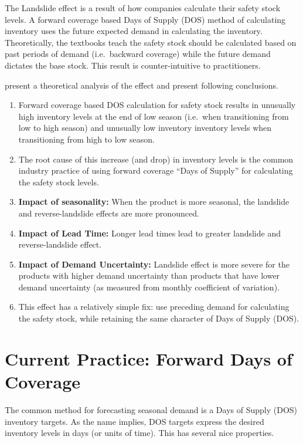 \documentclass[,msom,nonblindrev]{informs}
\providecommand{\tightlist}{%
  \setlength{\itemsep}{0pt}\setlength{\parskip}{0pt}}
\begin{document}
The Landslide effect is a result of how companies calculate their safety
stock levels. A forward coverage based Days of Supply (DOS) method of
calculating inventory uses the future expected demand in calculating the
inventory. Theoretically, the textbooks teach the safety stock should be
calculated based on past periods of demand (i.e.~backward coverage)
while the future demand dictates the base stock. This result is
counter-intuitive to practitioners.

\citet{neale2014} present a theoretical analysis of the effect and
present following conclusions.

\begin{enumerate}
\def\labelenumi{\arabic{enumi}.}
\tightlist
\item
  Forward coverage based DOS calculation for safety stock results in
  unusually high inventory levels at the end of low season (i.e.~when
  transitioning from low to high season) and unusually low inventory
  inventory levels when transitioning from high to low season.
\item
  The root cause of this increase (and drop) in inventory levels is the
  common industry practice of using forward coverage ``Days of Supply''
  for calculating the safety stock levels.
\item
  \textbf{Impact of seasonality:} When the product is more seasonal, the
  landslide and reverse-landslide effects are more pronounced.
\item
  \textbf{Impact of Lead Time:} Longer lead times lead to greater
  landslide and reverse-landslide effect.
\item
  \textbf{Impact of Demand Uncertainty:} Landslide effect is more severe
  for the products with higher demand uncertainty than products that
  have lower demand uncertainty (as measured from monthly coefficient of
  variation).
\item
  This effect has a relatively simple fix: use preceding demand for
  calculating the safety stock, while retaining the same character of
  Days of Supply (DOS).
\end{enumerate}

\hypertarget{current-practice-forward-days-of-coverage}{%
\section{Current Practice: Forward Days of
Coverage}\label{current-practice-forward-days-of-coverage}}

The common method for forecasting seasonal demand is a Days of Supply
(DOS) inventory targets. As the name implies, DOS targets express the
desired inventory levels in days (or units of time). This has several
nice properties.
\end{document}
